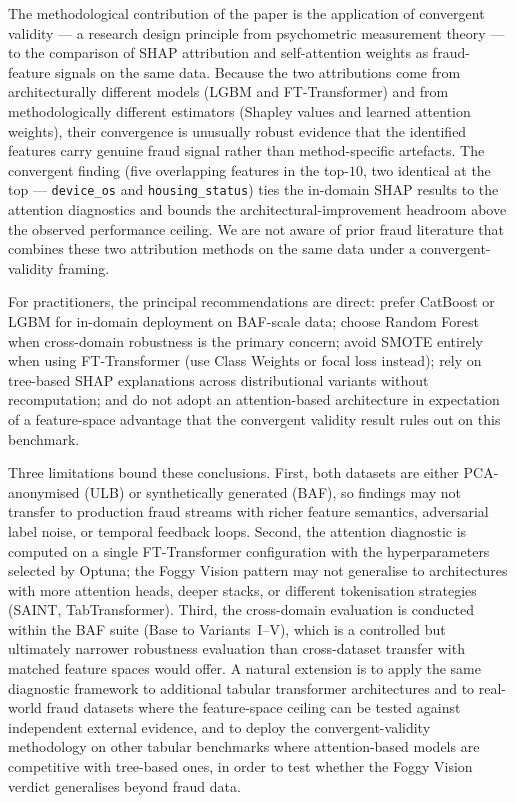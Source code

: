 \documentclass[a4paper,fleqn]{cas-sc}
\begin{document}
The methodological contribution of the paper is the application of
convergent validity --- a research design principle from psychometric
measurement theory --- to the comparison of SHAP attribution and self-attention
weights as fraud-feature signals on the same data.
Because the two attributions come from architecturally different models
(LGBM and FT-Transformer) and from methodologically different estimators
(Shapley values and learned attention weights), their convergence is
unusually robust evidence that the identified features carry genuine fraud
signal rather than method-specific artefacts.
The convergent finding (five overlapping features in the top-$10$, two
identical at the top --- \texttt{device\_os} and \texttt{housing\_status}) ties
the in-domain SHAP results to the attention diagnostics and bounds the
architectural-improvement headroom above the observed performance ceiling.
We are not aware of prior fraud literature that combines these two
attribution methods on the same data under a convergent-validity framing.

For practitioners, the principal recommendations are direct: prefer CatBoost or
LGBM for in-domain deployment on BAF-scale data; choose Random Forest when
cross-domain robustness is the primary concern; avoid SMOTE entirely when
using FT-Transformer (use Class Weights or focal loss instead); rely on tree-based
SHAP explanations across distributional variants without recomputation; and do
not adopt an attention-based architecture in expectation of a feature-space
advantage that the convergent validity result rules out on this benchmark.

Three limitations bound these conclusions.
First, both datasets are either PCA-anonymised (ULB) or synthetically generated
(BAF), so findings may not transfer to production fraud streams with richer
feature semantics, adversarial label noise, or temporal feedback loops.
Second, the attention diagnostic is computed on a single FT-Transformer
configuration with the hyperparameters selected by Optuna; the Foggy Vision
pattern may not generalise to architectures with more attention heads, deeper
stacks, or different tokenisation strategies (SAINT, TabTransformer).
Third, the cross-domain evaluation is conducted within the BAF suite (Base to
Variants~I--V), which is a controlled but ultimately narrower robustness
evaluation than cross-dataset transfer with matched feature spaces would offer.
A natural extension is to apply the same diagnostic framework to additional
tabular transformer architectures and to real-world fraud datasets where the
feature-space ceiling can be tested against independent external evidence,
and to deploy the convergent-validity methodology on other tabular benchmarks
where attention-based models are competitive with tree-based ones, in order to
test whether the Foggy Vision verdict generalises beyond fraud data.
\end{document}

